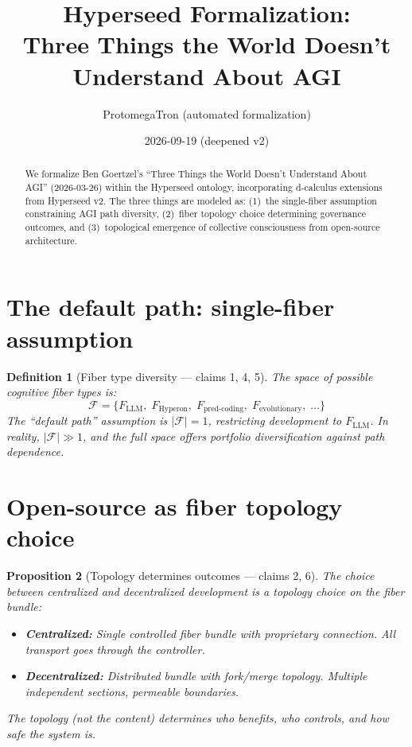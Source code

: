 \documentclass[11pt,a4paper]{article}
\title{Hyperseed Formalization:\\
  Three Things the World Doesn't Understand About AGI}
\author{ProtomegaTron (automated formalization)}
\date{2026-09-19 (deepened v2)}
\newtheorem{definition}{Definition}[section]
\newtheorem{proposition}[definition]{Proposition}
\begin{document}
\maketitle

\begin{abstract}
We formalize Ben Goertzel's ``Three Things the World Doesn't Understand
About AGI'' (2026-03-26) within the Hyperseed ontology, incorporating
d-calculus extensions from Hyperseed v2. The three things are modeled as:
(1)~the single-fiber assumption constraining AGI path diversity,
(2)~fiber topology choice determining governance outcomes, and
(3)~topological emergence of collective consciousness from open-source
architecture.
\end{abstract}

\tableofcontents

\section{The default path: single-fiber assumption}

\begin{definition}[Fiber type diversity --- claims 1, 4, 5]
The space of possible cognitive fiber types is:
\[
  \mathcal{F} = \{F_{\text{LLM}},\; F_{\text{Hyperon}},\; F_{\text{pred-coding}},\;
    F_{\text{evolutionary}},\; \ldots\}
\]
The ``default path'' assumption is $|\mathcal{F}| = 1$, restricting
development to $F_{\text{LLM}}$. In reality, $|\mathcal{F}| \gg 1$,
and the full space offers portfolio diversification against path
dependence.
\end{definition}

\section{Open-source as fiber topology choice}

\begin{proposition}[Topology determines outcomes --- claims 2, 6]
\label{prop:topology}
The choice between centralized and decentralized development is a
topology choice on the fiber bundle:
\begin{itemize}
  \item \textbf{Centralized:} Single controlled fiber bundle with
    proprietary connection. All transport goes through the controller.
  \item \textbf{Decentralized:} Distributed bundle with fork/merge
    topology. Multiple independent sections, permeable boundaries.
\end{itemize}
The topology (not the content) determines who benefits, who controls,
and how safe the system is.
\end{proposition}
\end{document}
